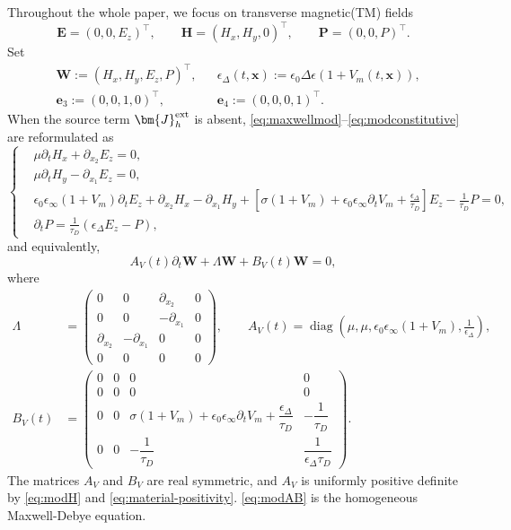 \documentclass[11pt,reqno]{amsart}
\newcommand{\diag}{\operatorname{diag}}
\numberwithin{equation}{section}
\begin{document}
Throughout the whole paper, we focus on transverse magnetic(TM) fields
$$
\bm E=(0,0,E_z)^\top,
\qquad
\bm H=(H_x,H_y,0)^\top,
\qquad
\bm P=(0,0,P)^\top.
$$
Set
\begin{align*}
&\bm{W}:=(H_x,H_y,E_z,P)^\top, &&
\epsilon_\Delta(t,\bm{x}):=\epsilon_0\Delta\epsilon(1+V_m(t,\bm{x})), \\
&\bm{e}_3:=(0,0,1,0)^\top, &&
\bm{e}_4:=(0,0,0,1)^\top.
\end{align*}
When the source term $\bm{J}_h^{\rm ext}$ is absent, \eqref{eq:maxwellmod}--\eqref{eq:modconstitutive} are reformulated as
\begin{equation}\label{eq:system}
\left\{
\begin{aligned}
&\mu\partial_tH_x+\partial_{x_2}E_z=0,\\
&\mu\partial_tH_y-\partial_{x_1}E_z=0,\\
&\epsilon_0\epsilon_\infty(1+V_m)\partial_tE_z
 +\partial_{x_2}H_x-\partial_{x_1}H_y+\left[\sigma(1+V_m)+\epsilon_0\epsilon_\infty\partial_tV_m
 +\frac{\epsilon_\Delta}{\tau_D}\right]E_z-\frac1{\tau_D}P=0,\\
&\partial_tP=\frac1{\tau_D}(\epsilon_\Delta E_z-P),
\end{aligned}
\right.
\end{equation}
and equivalently,
\begin{equation}\label{eq:modmatrix}
A_V(t)\partial_t\bm{W}+\Lambda\bm{W}+B_V(t)\bm{W}=0,
\end{equation}
where
\begin{equation}\label{eq:modAB}
\begin{aligned}
\Lambda&=
\begin{pmatrix}
0 & 0 & \partial_{x_2} & 0\\
0 & 0 & -\partial_{x_1} & 0\\
\partial_{x_2} & -\partial_{x_1} & 0 & 0\\
0 & 0 & 0 & 0
\end{pmatrix}, \qquad
A_V(t)=\diag\left(
\mu,\mu,\epsilon_0\epsilon_\infty(1+V_m),\frac{1}{\epsilon_\Delta}
\right),\\
B_V(t) & =
\begin{pmatrix}
0 & 0 & 0 & 0\\
0 & 0 & 0 & 0\\
0 & 0 & \sigma(1+V_m)+\epsilon_0\epsilon_\infty\partial_tV_m+
\dfrac{\epsilon_\Delta}{\tau_D} & -\dfrac1{\tau_D}\\
0 & 0 & -\dfrac1{\tau_D} & \dfrac1{\epsilon_\Delta\tau_D}
\end{pmatrix}.
\end{aligned}
\end{equation}
The matrices $A_V$ and $B_V$ are real symmetric, and $A_V$ is uniformly positive definite by \eqref{eq:modH} and \eqref{eq:material-positivity}. \eqref{eq:modAB} is the homogeneous Maxwell-Debye equation.
\end{document}
